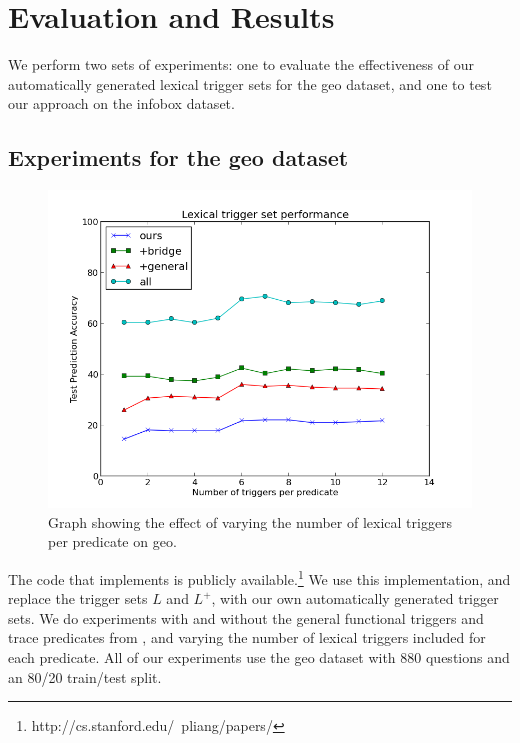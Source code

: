 \documentclass[11pt]{article}
\begin{document}
\section{Evaluation and Results}\label{results}

We perform two sets of experiments: one to evaluate the effectiveness of our
automatically generated lexical trigger sets for the {\sc geo} dataset, and
one to test our approach on the {\sc infobox} dataset. 

\subsection{Experiments for the {\sc geo} dataset}

\begin{figure}[!htb]\label{fig1}
\begin{center}
  \includegraphics[scale=0.40]{figs/ablationTest.png}
\caption{Graph showing the effect of varying the number of lexical triggers per predicate 
on {\sc geo}. }
\end{center}
\end{figure}

The code that implements \cite{LJK11} is publicly
available.\footnote{http://cs.stanford.edu/~pliang/papers/} We use this
implementation, and replace the trigger sets $L$ and $L^+$, with our own
automatically generated trigger sets. We do experiments with and without the
general functional triggers and trace predicates from \cite{LJK11}, and varying
the number of lexical triggers included for each predicate. All of our
experiments use the {\sc geo} dataset with 880 questions and an 80/20 train/test
split. 
\end{document}
